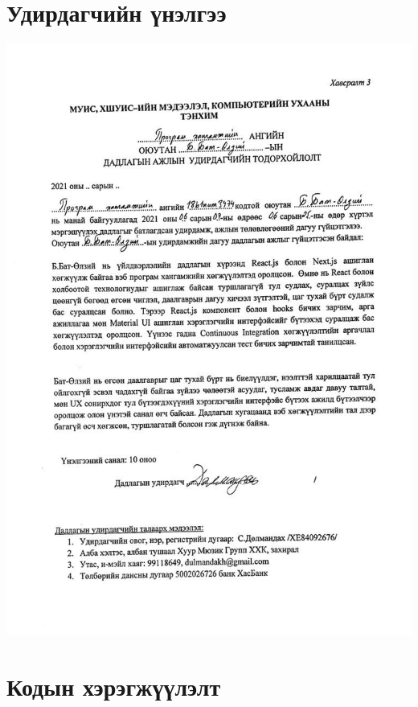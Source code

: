 
\appendix
{}

\chapter{Удирдагчийн үнэлгээ}
\includegraphics[width=14cm]{images/review.jpeg}
\chapter{Кодын хэрэгжүүлэлт}

